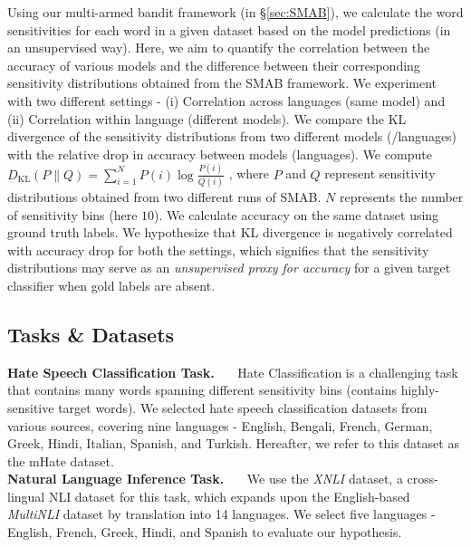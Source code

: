 Using our multi-armed bandit framework (in \S\ref{sec:SMAB}), we calculate the word sensitivities for each word in a given dataset based on the model predictions (in an unsupervised way). Here, we aim to quantify the correlation between the accuracy of various models and the difference between their corresponding sensitivity distributions obtained from the SMAB framework. %
We experiment with two different settings - (i) Correlation across languages (same model) and (ii) Correlation within language (different models). We compare the KL divergence of the sensitivity distributions from two different models (/languages) with the relative drop in accuracy between models (languages). We compute
$
\label{eq:kld}
D_{\text{KL}}(P \parallel Q) = \sum_{i=1}^{N} P(i) \log \frac{P(i)}{Q(i)}
$
, where $P$ and $Q$ represent sensitivity distributions obtained from two different runs of SMAB. $N$ represents the number of sensitivity bins (here $10$). We calculate accuracy on the same dataset using ground truth labels.
We hypothesize that KL divergence is negatively correlated with accuracy drop for both the settings, which signifies that the sensitivity distributions may serve as an \textit{unsupervised proxy for accuracy} for a given target classifier when gold labels are absent.

\subsection{Tasks \& Datasets}
\textbf{Hate Speech Classification Task.}~~~
Hate Classification is a challenging task that contains many words spanning different sensitivity bins (contains highly-sensitive target words). We selected hate speech classification datasets from various sources, covering nine languages - English, Bengali, French, German, Greek, Hindi, Italian, Spanish, and Turkish. Hereafter, we refer to this dataset as the mHate dataset.
\\\noindent
\textbf{Natural Language Inference Task.}~~~
We use the \textit{XNLI} \cite{conneau-etal-2018-xnli} dataset, a cross-lingual NLI dataset for this task, which expands upon the English-based \textit{MultiNLI} dataset \cite{williams-etal-2018-broad} by translation into 14 languages. We select five languages - English, French, Greek, Hindi, and Spanish to evaluate our hypothesis.

